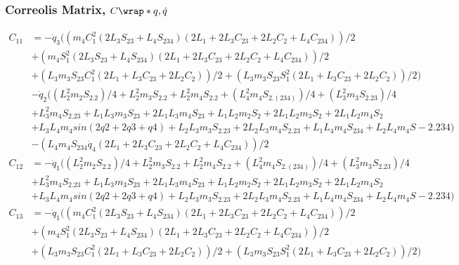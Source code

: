 \subsubsection{Correolis Matrix, $C\wrap*{q,\dot{q}}$}
\begin{equation}
	\begin{split} 
	C_{11} 	& = -\dot{q}_{3} ((m_{4} C_{1}^2 (2 L_{3} S_{23} + L_{4} S_{234}) (2 L_{1} + 2 L_{3} C_{23} + 2 L_{2} C_{2} + L_{4} C_{234}))/2\\ 
			& + (m_{4} S_{1}^2 (2 L_{3} S_{23} + L_{4} S_{234}) (2 L_{1} + 2 L_{3} C_{23} + 2 L_{2} C_{2} + L_{4} C_{234}))/2 \\
			& + (L_{3} m_{3} S_{23} C_{1}^2 (2 L_{1} + L_{3} C_{23} + 2 L_{2} C_{2}))/2 + (L_{3} m_{3} S_{23} S_{1}^2 (2 L_{1} + L_{3} C_{23} + 2 L_{2} C_{2}))/2) \\
			& - \dot{q}_{2} ((L_{2}^2 m_{2} S_{2.2})/4 + L_{2}^2 m_{3} S_{2.2} + L_{2}^2 m_{4} S_{2.2} + (L_{4}^2 m_{4} S_{2.(234)})/4 + (L_{3}^2 m_{3} S_{2.23})/4 \\
			& + L_{3}^2 m_{4} S_{2.23} + L_{1} L_{3} m_{3} S_{23} + 2 L_{1} L_{3} m_{4} S_{23} + L_{1} L_{2} m_{2} S_{2} + 2 L_{1} L_{2} m_{3} S_{2} + 2 L_{1} L_{2} m_{4} S_{2} \\
			& + L_{3} L_{4} m_{4} sin(2 q2 + 2 q3 + q4) + L_{2} L_{3} m_{3} S_{2.23} + 2 L_{2} L_{3} m_{4} S_{2.23} + L_{1} L_{4} m_{4} S_{234} + L_{2} L_{4} m_{4} S-{2.234}) \\
			& - (L_{4} m_{4} S_{234} \dot{q}_{4} (2 L_{1} + 2 L_{3} C_{23} + 2 L_{2} C_{2} + L_{4} C_{234}))/2\\
 	C_{12} 	& = -\dot{q}_{1} ((L_{2}^2 m_{2} S_{2.2})/4 + L_{2}^2 m_{3} S_{2.2} + L_{2}^2 m_{4} S_{2.2} + (L_{4}^2 m_{4} S_{2.(234)})/4 + (L_{3}^2 m_{3} S_{2.23})/4 \\
 			& + L_{3}^2 m_{4} S_{2.23} + L_{1} L_{3} m_{3} S_{23} + 2 L_{1} L_{3} m_{4} S_{23} + L_{1} L_{2} m_{2} S_{2} + 2 L_{1} L_{2} m_{3} S_{2} + 2 L_{1} L_{2} m_{4} S_{2} \\
 			& + L_{3} L_{4} m_{4} sin(2 q2 + 2 q3 + q4) + L_{2} L_{3} m_{3} S_{2.23} + 2 L_{2} L_{3} m_{4} S_{2.23} + L_{1} L_{4} m_{4} S_{234} + L_{2} L_{4} m_{4} S-{2.234})\\
 	C_{13} 	& = -\dot{q}_{1} ((m_{4} C_{1}^2 (2 L_{3} S_{23} + L_{4} S_{234}) (2 L_{1} + 2 L_{3} C_{23} + 2 L_{2} C_{2} + L_{4} C_{234}))/2 \\
 			& + (m_{4} S_{1}^2 (2 L_{3} S_{23} + L_{4} S_{234}) (2 L_{1} + 2 L_{3} C_{23} + 2 L_{2} C_{2} + L_{4} C_{234}))/2 \\
 			& + (L_{3} m_{3} S_{23} C_{1}^2 (2 L_{1} + L_{3} C_{23} + 2 L_{2} C_{2}))/2 + (L_{3} m_{3} S_{23} S_{1}^2 (2 L_{1} + L_{3} C_{23} + 2 L_{2} C_{2}))/2)\\

\end{split}
\end{equation}
